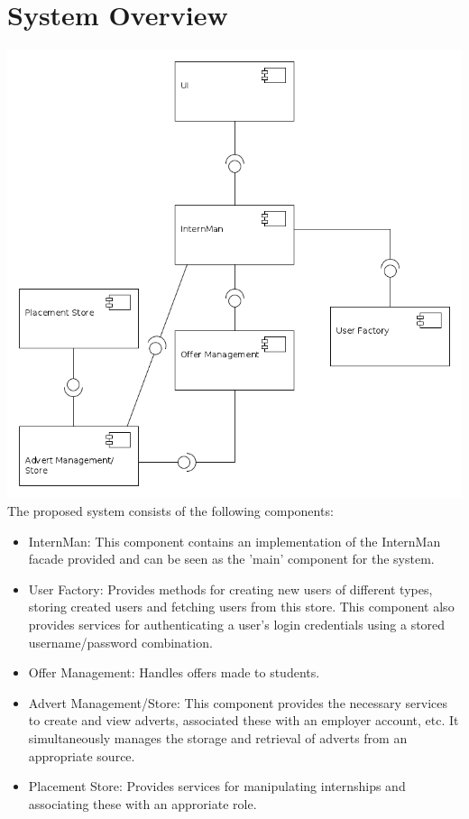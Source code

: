 \documentclass{l3deliverable}
\begin{document}
\section{System Overview}
\includegraphics[scale = 0.4]{ComponentDiagram.png}
\\
The proposed system consists of the following components:
\begin{itemize}
\item{InternMan: This component contains an implementation of the InternMan facade provided and can be seen as the 'main' component for the system. }
\item{User Factory: Provides methods for creating new users of different types, storing created users and fetching users from this store. This component also provides
services for authenticating a user's login credentials using a stored username/password combination.}
\item{Offer Management: Handles offers made to students.}
\item{Advert Management/Store: This component provides the necessary services to create and view adverts, associated these with an employer account, etc. It simultaneously
manages the storage and retrieval of adverts from an appropriate source.}
\item{Placement Store: Provides services for manipulating internships and associating these with an approriate role.}
\end{itemize}
\end{document}
